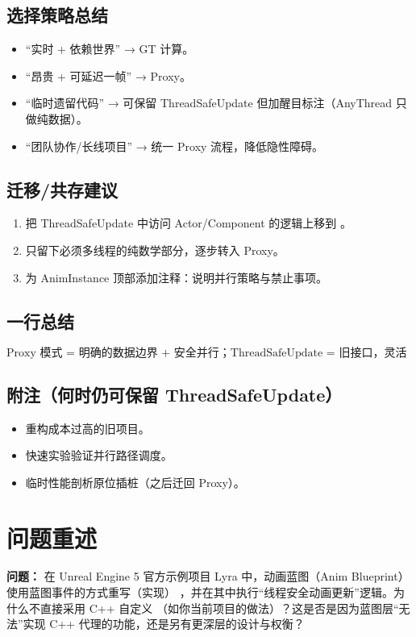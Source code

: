 \documentclass[10pt,openright,oneside,CJKmath]{MyBook}
\begin{document}
\subsection{选择策略总结}
\begin{itemize}
  \item “实时 + 依赖世界” → GT 计算。
  \item “昂贵 + 可延迟一帧” → Proxy。
  \item “临时遗留代码” → 可保留 ThreadSafeUpdate 但加醒目标注（AnyThread 只做纯数据）。
  \item “团队协作/长线项目” → 统一 Proxy 流程，降低隐性障碍。
\end{itemize}

\subsection{迁移/共存建议}
\begin{enumerate}
  \item 把 ThreadSafeUpdate 中访问 Actor/Component 的逻辑上移到 。
  \item 只留下必须多线程的纯数学部分，逐步转入 Proxy。
  \item 为 AnimInstance 顶部添加注释：说明并行策略与禁止事项。
\end{enumerate}

\subsection{一行总结}
\[
\boxed{\text{Proxy 模式 = 明确的数据边界 + 安全并行；ThreadSafeUpdate = 旧接口，灵活但易踩坑。}}
\]

\subsection{附注（何时仍可保留 ThreadSafeUpdate）}
\begin{itemize}
  \item 重构成本过高的旧项目。
  \item 快速实验验证并行路径调度。
  \item 临时性能剖析原位插桩（之后迁回 Proxy）。
\end{itemize}


\section{问题重述}
\textbf{问题：} 在 Unreal Engine 5 官方示例项目 Lyra 中，动画蓝图（Anim Blueprint）使用蓝图事件的方式重写（实现） ，并在其中执行“线程安全动画更新”逻辑。为什么不直接采用 C++ 自定义 （如你当前项目的做法）？这是否是因为蓝图层“无法”实现 C++ 代理的功能，还是另有更深层的设计与权衡？
\end{document}
